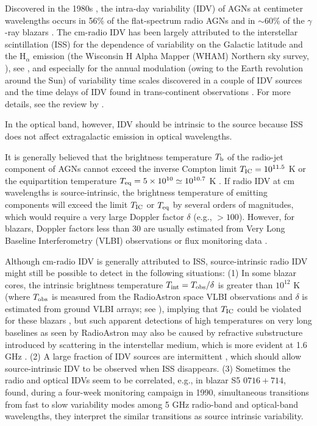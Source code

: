 \documentclass[a4paper,fleqn,usenatbib]{mnras}
\begin{document}
Discovered in the 1980s \citep{witz86,hees87}, the intra-day variability (IDV) of AGNs at centimeter wavelengths occurs in 56\% of the flat-spectrum radio AGNs \citep{love08} and in \(\sim\)60\% of the \(\gamma\)-ray blazars \citep{liu12a}. The cm-radio IDV has been largely attributed to the interstellar scintillation (ISS) for the dependence of variability on the Galactic latitude and the H$_{\alpha}$ emission (the Wisconsin H Alpha Mapper (WHAM) Northern sky survey, \cite{haff03}), see \cite{love08}, and especially for the annual modulation (owing to the Earth revolution around the Sun) of variability time scales discovered in a couple of IDV sources \citep[e.g.][]{jaun01,rick01,denn03,big03,big06,gaban07,liu12b,liu13} and the time delays of IDV found in trans-continent observations \citep{jaun00,denn02,big06}. For more details, see the review by \cite{jaun16}.

In the optical band, however, IDV should be intrinsic to the source because ISS does not affect extragalactic emission in optical wavelengths.

It is generally believed that the brightness temperature \(T_{\rm b}\) of the radio-jet component of AGNs cannot exceed the inverse Compton limit \(T_{\rm IC}=10^{11.5}\) K \citep{kell69} or the equipartition temperature \(T_{\rm eq}=5\times 10^{10}\simeq10^{10.7}\) K \citep{read94}. If radio IDV at cm wavelengths is source-intrinsic, the brightness temperature of emitting components will exceed the limit \(T_{\rm IC}\) or \(T_{\rm eq}\) by several orders of magnitudes, which would require a very large Doppler factor \(\delta\) (e.g., \({>} 100\)). However, for blazars, Doppler factors less than 30 are usually estimated from Very Long Baseline Interferometry (VLBI) observations or flux monitoring data \citep{liod17}.

Although cm-radio IDV is generally attributed to ISS, source-intrinsic radio IDV might still be possible to detect in the following situations: (1) In some blazar cores, the intrinsic brightness temperature \(T_{\rm int}=T_{\rm obs}/\delta\) is greater than \(10^{12}\) K (where \(T_{\rm obs}\) is measured from the RadioAstron space VLBI observations and \(\delta\) is estimated from ground VLBI arrays; see \cite{kova16}), implying that \(T_{\rm IC}\) could be violated for these blazars \citep{mars16}, but such apparent detections of high temperatures on very long baselines as seen by RadioAstron may also be caused by refractive substructure
introduced by scattering in the interstellar medium, which is more evident at 1.6 GHz \citep{john16}. (2) A large fraction of IDV sources are intermittent \citep{ked06,love08}, which should allow source-intrinsic IDV to be observed when ISS disappears. (3) Sometimes the radio and optical IDVs seem to be correlated, e.g., in blazar S5 \(0716+714\), \cite{quir91} found, during a four-week monitoring campaign in 1990, simultaneous transitions from fast to slow variability modes among 5 GHz radio-band and optical-band wavelengths, they interpret the similar transitions as source intrinsic variability.
\end{document}
